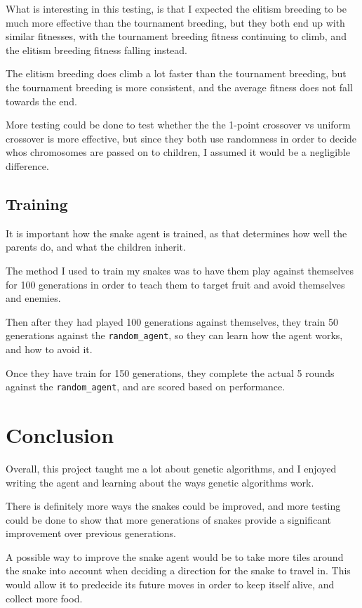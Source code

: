 \documentclass[12pt]{article}
\begin{document}
What is interesting in this testing, is that I expected the elitism breeding to be much more effective than the tournament breeding, but they both end up with similar fitnesses, with the tournament breeding fitness continuing to climb, and the elitism breeding fitness falling instead.

The elitism breeding does climb a lot faster than the tournament breeding, but the tournament breeding is more consistent, and the average fitness does not fall towards the end.

More testing could be done to test whether the the 1-point crossover vs uniform crossover is more effective, but since they both use randomness in order to decide whos chromosomes are passed on to children, I assumed it would be a negligible difference.

\subsection{Training}

It is important how the snake agent is trained, as that determines how well the parents do, and what the children inherit.

The method I used to train my snakes was to have them play against themselves for 100 generations in order to teach them to target fruit and avoid themselves and enemies.

Then after they had played 100 generations against themselves, they train 50 generations against the \verb|random_agent|, so they can learn how the agent works, and how to avoid it.

Once they have train for 150 generations, they complete the actual 5 rounds against the \verb|random_agent|, and are scored based on performance.

\section{Conclusion}

Overall, this project taught me a lot about genetic algorithms, and I enjoyed writing the agent and learning about the ways genetic algorithms work.

There is definitely more ways the snakes could be improved, and more testing could be done to show that more generations of snakes provide a significant improvement over previous generations.

A possible way to improve the snake agent would be to take more tiles around the snake into account when deciding a direction for the snake to travel in. This would allow it to predecide its future moves in order to keep itself alive, and collect more food.
\end{document}
